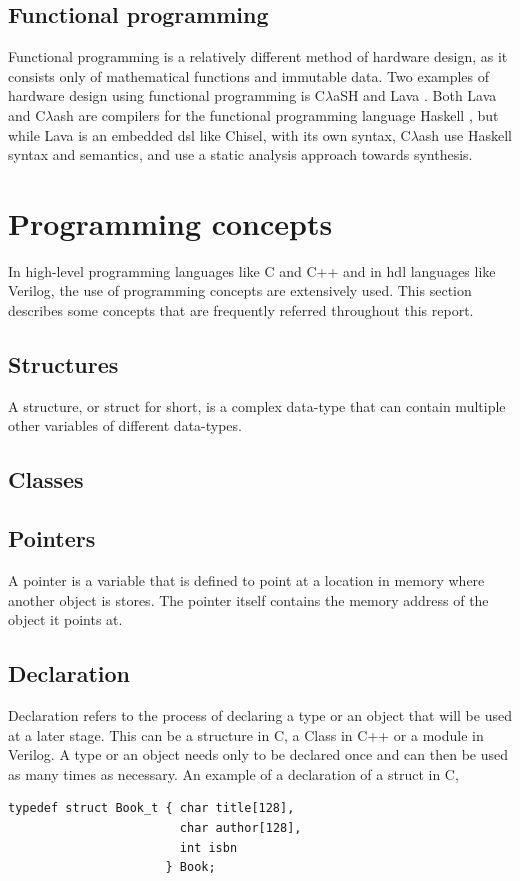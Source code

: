 \subsection{Functional programming}
Functional programming is a relatively different method of hardware design, as it consists only of mathematical functions and immutable data. Two examples of hardware design using functional programming is C$\lambda$aSH \cite{baaij2009clash} and Lava \cite{bjesse1998lava}. Both Lava and C$\lambda$ash are compilers for the functional programming language Haskell \cite{haskellonline}, but while Lava is an embedded \gls{dsl} like Chisel, with its own syntax, C$\lambda$ash use Haskell syntax and semantics, and use a static analysis approach towards synthesis.

\section{Programming concepts}
In high-level programming languages like C and C++ and in \gls{hdl} languages like Verilog, the use of programming concepts are extensively used. This section describes some concepts that are frequently referred throughout this report.
\subsection{Structures}
A structure, or struct for short, is a complex data-type that can contain multiple other variables of different data-types. 
\subsection{Classes}

\subsection{Pointers}
A pointer is a variable that is defined to point at a location in memory where another object is stores. The pointer itself contains the memory address of the object it points at.
\subsection{Declaration}
Declaration refers to the process of declaring a type or an object that will be used at a later stage. This can be a structure in C, a Class in C++ or a module in Verilog. A type or an object needs only to be declared once and can then be used as many times as necessary. An example of a declaration of a struct in C,  
\lstset{language=C++, style=Cstyle}
\begin{lstlisting}
typedef struct Book_t { char title[128], 
                        char author[128], 
                        int isbn 
                      } Book;
\end{lstlisting}

